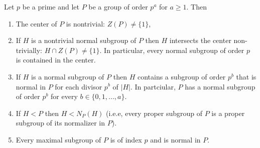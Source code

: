 \documentclass[12pt, a4paper, oneside, openright, titlepage]{book}
\begin{document}
\begin{thm}
    Let $p$ be a prime and let $P$ be a group of order $p^a$ for $a \geq 1$. Then \begin{enumerate}
        \item The center of $P$ is nontrivial: $Z(P) \neq \{1\}$,
        \item If $H$ is a nontrivial normal subgroup of $P$ then $H$ intersects the center non-trivially: $H \cap Z(P) \neq \{1\}$. In particular, every normal subgroup of order $p$ is contained in the center.
        \item If $H$ is a normal subgroup of $P$ then $H$ contains a subgroup of order $p^b$ that is normal in $P$ for each divisor $p^b$ of $|H|$. In partciular, $P$ has a normal subgroup of order $p^b$ for every $b \in \{0,1,...,a\}$.
        \item If $H < P$ then $H < N_P(H)$ (i.e.e, every proper subgroup of $P$ is a proper subgroup of its normalizer in $P$).
        \item Every maximal subgroup of $P$ is of index $p$ and is normal in $P$.
    \end{enumerate}
\end{thm}
\end{document}
